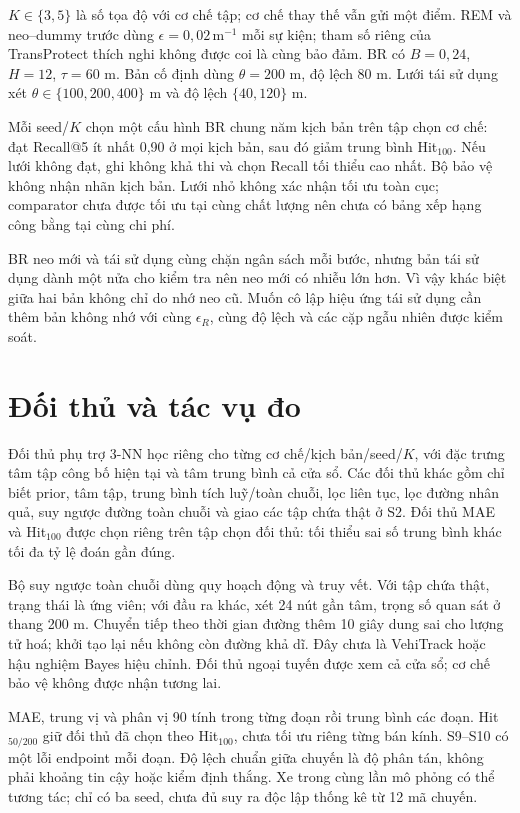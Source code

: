 $K\in\{3,5\}$ là số tọa độ với cơ chế tập; cơ chế thay thế vẫn gửi một điểm. REM và neo--dummy trước dùng $\epsilon=0{,}02\,\mathrm{m}^{-1}$ mỗi sự kiện; tham số riêng của TransProtect thích nghi không được coi là cùng bảo đảm. BR có $B=0{,}24$, $H=12$, $\tau=60$ m. Bản cố định dùng $\theta=200$ m, độ lệch 80 m. Lưới tái sử dụng xét $\theta\in\{100,200,400\}$ m và độ lệch $\{40,120\}$ m.

Mỗi seed/$K$ chọn một cấu hình BR chung năm kịch bản trên tập chọn cơ chế: đạt Recall@5 ít nhất 0,90 ở mọi kịch bản, sau đó giảm trung bình Hit$_{100}$. Nếu lưới không đạt, ghi không khả thi và chọn Recall tối thiểu cao nhất. Bộ bảo vệ không nhận nhãn kịch bản. Lưới nhỏ không xác nhận tối ưu toàn cục; comparator chưa được tối ưu tại cùng chất lượng nên chưa có bảng xếp hạng công bằng tại cùng chi phí.

BR neo mới và tái sử dụng cùng chặn ngân sách mỗi bước, nhưng bản tái sử dụng dành một nửa cho kiểm tra nên neo mới có nhiễu lớn hơn. Vì vậy khác biệt giữa hai bản không chỉ do nhớ neo cũ. Muốn cô lập hiệu ứng tái sử dụng cần thêm bản không nhớ với cùng $\epsilon_R$, cùng độ lệch và các cặp ngẫu nhiên được kiểm soát.

\section{Đối thủ và tác vụ đo}

Đối thủ phụ trợ 3-NN học riêng cho từng cơ chế/kịch bản/seed/$K$, với đặc trưng tâm tập công bố hiện tại và tâm trung bình cả cửa sổ. Các đối thủ khác gồm chỉ biết prior, tâm tập, trung bình tích luỹ/toàn chuỗi, lọc liên tục, lọc đường nhân quả, suy ngược đường toàn chuỗi và giao các tập chứa thật ở S2. Đối thủ MAE và Hit$_{100}$ được chọn riêng trên tập chọn đối thủ: tối thiểu sai số trung bình khác tối đa tỷ lệ đoán gần đúng.

Bộ suy ngược toàn chuỗi dùng quy hoạch động và truy vết. Với tập chứa thật, trạng thái là ứng viên; với đầu ra khác, xét 24 nút gần tâm, trọng số quan sát ở thang 200 m. Chuyển tiếp theo thời gian đường thêm 10 giây dung sai cho lượng tử hoá; khởi tạo lại nếu không còn đường khả dĩ. Đây chưa là VehiTrack hoặc hậu nghiệm Bayes hiệu chỉnh. Đối thủ ngoại tuyến được xem cả cửa sổ; cơ chế bảo vệ không được nhận tương lai.

MAE, trung vị và phân vị 90 tính trong từng đoạn rồi trung bình các đoạn. Hit$_{50/200}$ giữ đối thủ đã chọn theo Hit$_{100}$, chưa tối ưu riêng từng bán kính. S9--S10 có một lỗi endpoint mỗi đoạn. Độ lệch chuẩn giữa chuyến là độ phân tán, không phải khoảng tin cậy hoặc kiểm định thắng. Xe trong cùng lần mô phỏng có thể tương tác; chỉ có ba seed, chưa đủ suy ra độc lập thống kê từ 12 mã chuyến.

